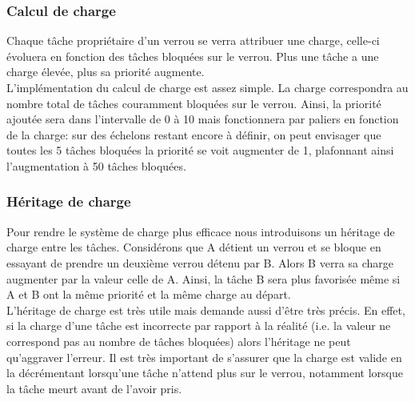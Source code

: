 \subsubsection{Calcul de charge}

Chaque tâche propriétaire d'un verrou se verra attribuer une charge, celle-ci évoluera en fonction
des tâches bloquées sur le verrou. Plus une tâche a une charge élevée, plus sa priorité augmente.
\\

L'implémentation du calcul de charge est assez simple. 
La charge correspondra au nombre total de tâches couramment bloquées sur le verrou. 
Ainsi, la priorité ajoutée sera dans l'intervalle de 0 à 10 mais fonctionnera par
paliers en fonction de la charge: sur des échelons restant encore à définir, on peut
envisager que toutes les 5 tâches bloquées la priorité se voit augmenter de 1,
plafonnant ainsi l'augmentation à 50 tâches bloquées.
\\



\subsubsection{Héritage de charge}

Pour rendre le système de charge plus efficace nous introduisons un héritage
de charge entre les tâches. Considérons que A détient un verrou et se bloque
en essayant de prendre un deuxième verrou détenu par B. Alors B verra sa
charge augmenter par la valeur celle de A. Ainsi, la tâche B sera plus favorisée même
si A et B ont la même priorité et la même charge au départ.
\\

L'héritage de charge est très utile mais demande aussi d'être très précis.
En effet, si la charge d'une tâche est incorrecte par rapport à la réalité
(i.e. la valeur ne correspond pas au nombre de tâches bloquées)
alors l'héritage ne peut qu'aggraver l'erreur. Il est très important
de s'assurer que la charge est valide en la décrémentant lorsqu'une tâche 
n'attend plus sur le verrou, notamment lorsque la tâche meurt avant de l'avoir pris.

